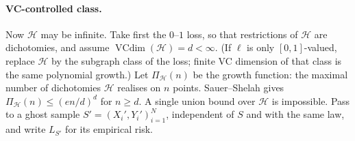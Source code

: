 \documentclass[11pt,a4paper]{article}
\DeclareMathOperator{\VCdim}{VCdim}
\theoremstyle{definition}
\begin{document}
\paragraph{VC-controlled class.}
Now \(\mathcal{H}\) may be infinite. Take first the \(0\)--\(1\) loss, so that restrictions of \(\mathcal{H}\) are dichotomies, and assume \(\VCdim(\mathcal{H})=d<\infty\). (If \(\ell\) is only \([0,1]\)-valued, replace \(\mathcal{H}\) by the subgraph class of the loss; finite VC dimension of that class is the same polynomial growth.) Let \(\Pi_{\mathcal{H}}(n)\) be the growth function: the maximal number of dichotomies \(\mathcal{H}\) realises on \(n\) points. Sauer--Shelah gives \(\Pi_{\mathcal{H}}(n)\le(en/d)^d\) for \(n\ge d\). A single union bound over \(\mathcal{H}\) is impossible. Pass to a ghost sample \(S'=(X_i',Y_i')_{i=1}^N\), independent of \(S\) and with the same law, and write \(L_{S'}\) for its empirical risk.
\end{document}
